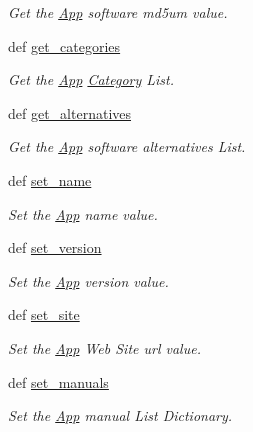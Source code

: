 \begin{CompactItemize}
\begin{CompactList}\small\item\em Get the \hyperlink{classwinsollib_1_1App}{App} software md5um value. \item\end{CompactList}\item 
def \hyperlink{classwinsollib_1_1App_ccb84833e593ebd7d619115e86ceb6d6}{get\_\-categories}
\begin{CompactList}\small\item\em Get the \hyperlink{classwinsollib_1_1App}{App} \hyperlink{classwinsollib_1_1Category}{Category} List. \item\end{CompactList}\item 
def \hyperlink{classwinsollib_1_1App_f3940b0348b589beae80ba316ba7fe2b}{get\_\-alternatives}
\begin{CompactList}\small\item\em Get the \hyperlink{classwinsollib_1_1App}{App} software alternatives List. \item\end{CompactList}\item 
def \hyperlink{classwinsollib_1_1App_9f37c429b7781d9bc0037b3f581fa717}{set\_\-name}
\begin{CompactList}\small\item\em Set the \hyperlink{classwinsollib_1_1App}{App} name value. \item\end{CompactList}\item 
def \hyperlink{classwinsollib_1_1App_4f59b1de4fdea104fe2e6143dd73596e}{set\_\-version}
\begin{CompactList}\small\item\em Set the \hyperlink{classwinsollib_1_1App}{App} version value. \item\end{CompactList}\item 
def \hyperlink{classwinsollib_1_1App_11788074387939e13d01d0574dccdef6}{set\_\-site}
\begin{CompactList}\small\item\em Set the \hyperlink{classwinsollib_1_1App}{App} Web Site url value. \item\end{CompactList}\item 
def \hyperlink{classwinsollib_1_1App_6784e178b869d2637ca9901245bf5e66}{set\_\-manuals}
\begin{CompactList}\small\item\em Set the \hyperlink{classwinsollib_1_1App}{App} manual List Dictionary. \item\end{CompactList}\item 

\end{CompactItemize}
